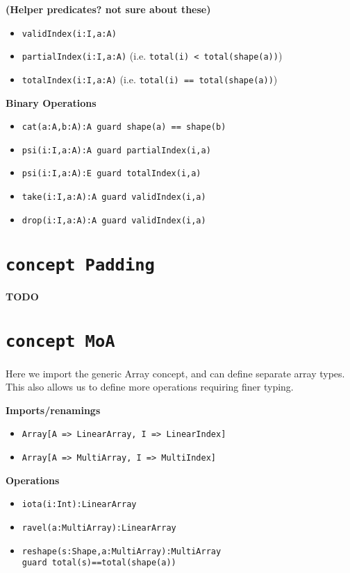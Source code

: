 \documentclass{article}
\begin{document}
\noindent \textbf{(Helper predicates? not sure about these)}
\begin{itemize}
    \item \texttt{validIndex(i:I,a:A)}
    \item \texttt{partialIndex(i:I,a:A)} (i.e. \texttt{total(i) < total(shape(a))})
    \item \texttt{totalIndex(i:I,a:A)} (i.e. \texttt{total(i) == total(shape(a))})
\end{itemize}
\noindent \textbf{Binary Operations}
\begin{itemize}
    \item \texttt{cat(a:A,b:A):A guard shape(a) == shape(b)}
    \item \texttt{psi(i:I,a:A):A guard partialIndex(i,a)}
    \item \texttt{psi(i:I,a:A):E guard totalIndex(i,a)}
    \item \texttt{take(i:I,a:A):A guard validIndex(i,a)}
    \item \texttt{drop(i:I,a:A):A guard validIndex(i,a)}
\end{itemize}

\section{\texttt{concept Padding}}
\noindent \textbf{TODO}
\section{\texttt{concept MoA}}
\noindent Here we import the generic Array concept, and can define separate array types. This also allows us to define more operations requiring finer typing.

\noindent \textbf{Imports/renamings}
\begin{itemize}
    \item \texttt{Array[A => LinearArray, I => LinearIndex]}
    \item \texttt{Array[A => MultiArray, I => MultiIndex]}
\end{itemize}

\noindent \textbf{Operations}
\begin{itemize}
    \item \texttt{iota(i:Int):LinearArray}
    \item \texttt{ravel(a:MultiArray):LinearArray}
    \item \texttt{reshape(s:Shape,a:MultiArray):MultiArray \\ guard total(s)==total(shape(a))}
\end{itemize}
\end{document}
